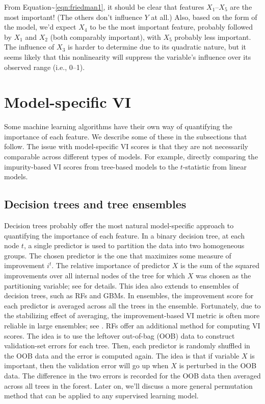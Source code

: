 From Equation\textasciitilde{}\eqref{eqn:friedman1}, it should be clear
that features \(X_1\)--\(X_5\) are the most important! (The others don't
influence \(Y\) at all.) Also, based on the form of the model, we'd
expect \(X_4\) to be the most important feature, probably followed by
\(X_1\) and \(X_2\) (both comparably important), with \(X_5\) probably
less important. The influence of \(X_3\) is harder to determine due to
its quadratic nature, but it seems likely that this nonlinearity will
suppress the variable's influence over its observed range (i.e., 0--1).

\section{Model-specific VI}

Some machine learning algorithms have their own way of quantifying the
importance of each feature. We describe some of these in the subsections
that follow. The issue with model-specific VI scores is that they are
not necessarily comparable across different types of models. For
example, directly comparing the impurity-based VI scores from tree-based
models to the \(t\)-statistic from linear models.

\subsection{Decision trees and tree ensembles}

Decision trees probably offer the most natural model-specific approach
to quantifying the importance of each feature. In a binary decision
tree, at each node \(t\), a single predictor is used to partition the
data into two homogeneous groups. The chosen predictor is the one that
maximizes some measure of improvement \(i^t\). The relative importance
of predictor \(X\) is the sum of the squared improvements over all
internal nodes of the tree for which \(X\) was chosen as the
partitioning variable; see \citet{classification-breiman-1984} for
details. This idea also extends to ensembles of decision trees, such as
RFs and GBMs. In ensembles, the improvement score for each predictor is
averaged across all the trees in the ensemble. Fortunately, due to the
stabilizing effect of averaging, the improvement-based VI metric is
often more reliable in large ensembles; see
\citet[p. 368]{hastie-elements-2009}. RFs offer an additional method for
computing VI scores. The idea is to use the leftover out-of-bag (OOB)
data to construct validation-set errors for each tree. Then, each
predictor is randomly shuffled in the OOB data and the error is computed
again. The idea is that if variable \(X\) is important, then the
validation error will go up when \(X\) is perturbed in the OOB data. The
difference in the two errors is recorded for the OOB data then averaged
across all trees in the forest. Later on, we'll discuss a more general
permutation method that can be applied to any supervised learning model.

